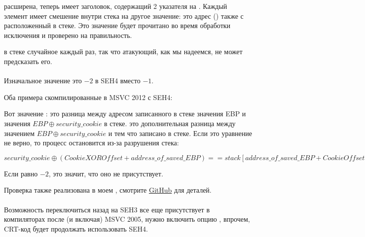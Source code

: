  расширена, теперь имеет заголовок, содержащий 2 указателя на .
Каждый элемент имеет смешение внутри стека на другое значение: это адрес  (\EBP) также  с 
 расположенный в стеке.
Это значение будет прочитано во время обработки исключения и проверено на правильность.

 в стеке случайное каждый раз, так что атакующий, как мы надеемся, не может предсказать его.\\
\\
Изначальное значение  это $-2$ в SEH4 вместо $-1$.

\def\SEHfour{1}


Оба примера скомпилированные в MSVC 2012 с SEH4:





Вот значение :  
это разница между адресом записанного в стеке значения EBP и значения $EBP \oplus security\_cookie$ в стеке.
 это дополнительная разница между значением $EBP \oplus security\_cookie$ и тем что записано в стеке.
Если это уравнение не верно, то процесс остановится из-за разрушения стека:

\begin{center}
$security\_cookie \oplus (CookieXOROffset + address\_of\_saved\_EBP) == stack[address\_of\_saved\_EBP + CookieOffset]$
\end{center}

Если  равно $-2$, это значит, что оно не присутствует.

Проверка  также реализована в моем \tracer{},
смотрите \href{http://go.yurichev.com/17061}{GitHub} для деталей.\\
\\
Возможность переключиться назад на SEH3 все еще присутствует в компиляторах после (и включая) MSVC 2005, нужно включить
опцию , впрочем, \ac{CRT}-код будет продолжать использовать SEH4.

